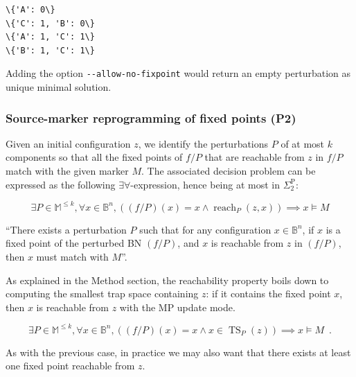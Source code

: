 \documentclass[PCJ,Unicode,screen,mode=plain]{cedram}
\begin{document}
    \begin{Verbatim}[commandchars=\\\{\}]
\{'A': 0\}
\{'C': 1, 'B': 0\}
\{'A': 1, 'C': 1\}
\{'B': 1, 'C': 1\}

    \end{Verbatim}
\medskip

Adding the option \texttt{-\/-allow-no-fixpoint} would return an empty
perturbation as unique minimal solution.
\hypertarget{source-marker-reprogramming-of-fixed-points-p2}{%
\subsubsection{Source-marker reprogramming of fixed points
(P2)}\label{source-marker-reprogramming-of-fixed-points-p2}}

Given an initial configuration \(z\), we identify the perturbations
\(P\) of at most \(k\) components so that all the fixed points of
\(f/P\) that are reachable from \(z\) in \(f/P\) match with the given
marker \(M\). The associated decision problem can be expressed as the
following \(\exists\forall\)-expression, hence being at most in
\(\Sigma_2^{\mathrm P}\):

\begin{equation}
    \exists P\in\mathbb M^{\leq k}, \forall x\in\mathbb B^n, ((f/P)(x)=x \wedge \operatorname{reach}_P(z,x))\implies x\models M
\end{equation}

``There exists a perturbation \(P\) such that for any configuration
\(x\in\mathbb B^n\), if \(x\) is a fixed point of the perturbed BN
\((f/P)\), and \(x\) is reachable from \(z\) in \((f/P)\), then \(x\)
must match with \(M\)''.

As explained in the Method section, the reachability property boils down
to computing the smallest trap space containing \(z\): if it contains
the fixed point \(x\), then \(x\) is reachable from \(z\) with the MP
update mode.

\begin{equation}
    \exists P\in\mathbb M^{\leq k}, \forall x\in\mathbb B^n, ((f/P)(x)=x \wedge 
x\in\operatorname{TS}_P(z))\implies x\models M\enspace.
\end{equation}

As with the previous case, in practice we may also want that there
exists at least one fixed point reachable from \(z\).
\end{document}
